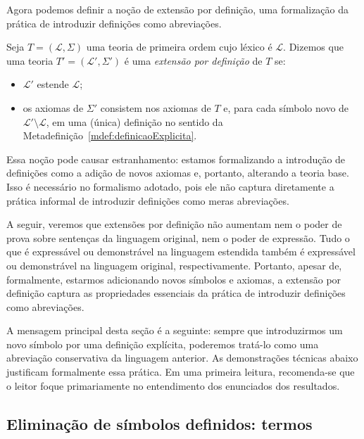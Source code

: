 Agora podemos definir a noção de extensão por definição, uma formalização da prática de introduzir definições como abreviações.

\begin{metadefinition}\label{mdef:extensaoPorDefinicao}
    Seja $T=(\mathcal L, \Sigma)$ uma teoria de primeira ordem cujo léxico é $\mathcal L$.
    Dizemos que uma teoria $T'=(\mathcal L', \Sigma')$ é uma \emph{extensão por definição} de $T$ se:
    \begin{itemize}
        \item $\mathcal L'$ estende $\mathcal L$;
        \item os axiomas de $\Sigma'$ consistem nos axiomas de $T$ e, para cada símbolo novo de $\mathcal L'\setminus\mathcal L$,
        em uma (única) definição no sentido da Metadefinição~\ref{mdef:definicaoExplicita}.
    \end{itemize}
\end{metadefinition}

Essa noção pode causar estranhamento: estamos formalizando a introdução de definições como a adição de novos axiomas e, portanto, alterando a teoria base.
Isso é necessário no formalismo adotado, pois ele não captura diretamente a prática informal de introduzir definições como meras abreviações.

A seguir, veremos que extensões por definição não aumentam nem o poder de prova sobre sentenças da linguagem original, nem o poder de expressão.
Tudo o que é expressável ou demonstrável na linguagem estendida também é expressável ou demonstrável na linguagem original, respectivamente.
Portanto, apesar de, formalmente, estarmos adicionando novos símbolos e axiomas, a extensão por definição captura as propriedades essenciais da prática de introduzir definições como abreviações.

A mensagem principal desta seção é a seguinte: sempre que introduzirmos um novo símbolo por uma definição explícita, poderemos tratá-lo como uma abreviação conservativa da linguagem anterior. 
As demonstrações técnicas abaixo justificam formalmente essa prática.
Em uma primeira leitura, recomenda-se que o leitor foque primariamente no entendimento dos enunciados dos resultados.

\subsection{Eliminação de símbolos definidos: termos}\label{subsec:eliminacaoSimbolosDefinidosTermos}

